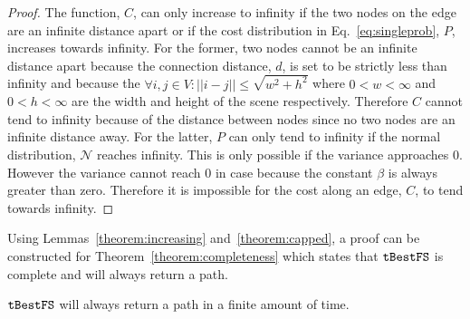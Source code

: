 \begin{proof}

    The function, $C$, can only increase to infinity if the two nodes on the
    edge are an infinite distance apart or if the cost distribution in
    Eq.~\ref{eq:singleprob}, $P$, increases towards infinity. For the former,
    two nodes cannot be an infinite distance apart because the connection
    distance, $d$, is set to be strictly less than infinity and because the
    $\forall i, j \in V : ||i - j|| \leq \sqrt{w^2 + h^2}$ where $0 < w <
    \infty$ and $0 < h < \infty$ are the width and height of the scene
    respectively. Therefore $C$ cannot tend to infinity because of the distance
    between nodes since no two nodes are an infinite distance away. For the
    latter, $P$ can only tend to infinity if the normal distribution,
    $\mathcal{N}$ reaches infinity. This is only possible if the variance
    approaches 0. However the variance cannot reach $0$ in case because the
    constant $\beta$ is always greater than zero. Therefore it is impossible
    for the cost along an edge, $C$, to tend towards infinity.

\end{proof}

Using Lemmas~\ref{theorem:increasing} and~\ref{theorem:capped}, a proof can be
constructed for Theorem~\ref{theorem:completeness} which states that
$\Acronym{tBestFS}$ is complete and will always return a path.

\begin{theorem}

    \label{theorem:completeness}

    $\Acronym{tBestFS}$ will always return a path in a finite amount of time.

\end{theorem}

